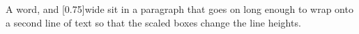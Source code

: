 \documentclass{article}
\begin{document}
A  word,  and \scalebox{1.5}[0.75]{wide}
sit in a paragraph that goes on long enough to wrap onto a second line of text
so that the scaled boxes change the line heights.
\end{document}
